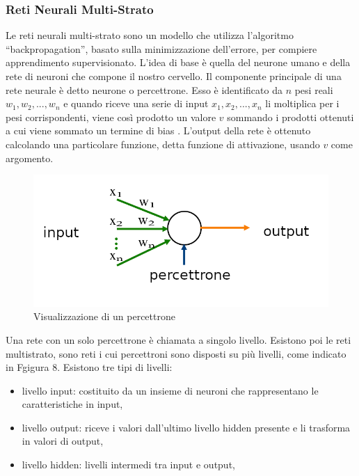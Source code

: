 \documentclass[12pt,italian]{report}
\begin{document}
\subsubsection{Reti Neurali Multi-Strato}
\label{MLP}
Le reti neurali multi-strato sono un modello che utilizza l'algoritmo ``backpropagation'', basato sulla minimizzazione dell'errore, per compiere apprendimento supervisionato. L'idea di base è quella del neurone umano e della rete di neuroni che compone il nostro cervello. Il componente principale di una rete neurale è detto neurone o percettrone. Esso è identificato da $n$ pesi reali $w_1, w_2,...,w_n$ e quando riceve una serie di input $x_1,x_2,...,x_n$ li moltiplica per i pesi corrispondenti, viene così prodotto un valore $v$ sommando i prodotti ottenuti a cui viene sommato un termine di bias \cite{multilayerPerceptron}.  L'output della rete è ottenuto calcolando una particolare funzione, detta funzione di attivazione, usando $v$ come argomento.

\begin{figure}[h]
	\centering
	\includegraphics[width = \textwidth]{immagini/Perceptron}
	\caption{Visualizzazione di un percettrone}
\end{figure}


Una rete con un solo percettrone è chiamata a singolo livello. Esistono poi le reti multistrato, sono reti i cui percettroni sono disposti su più livelli, come indicato in Fgigura 8. Esistono tre tipi di livelli: 
\begin{itemize}
	\item livello input: costituito da un insieme di neuroni che rappresentano le caratteristiche in input,
	\item livello output: riceve i valori dall'ultimo livello hidden presente e li trasforma in valori di output, 
	\item livello hidden: livelli intermedi tra input e output, 
\end{itemize}
\end{document}
